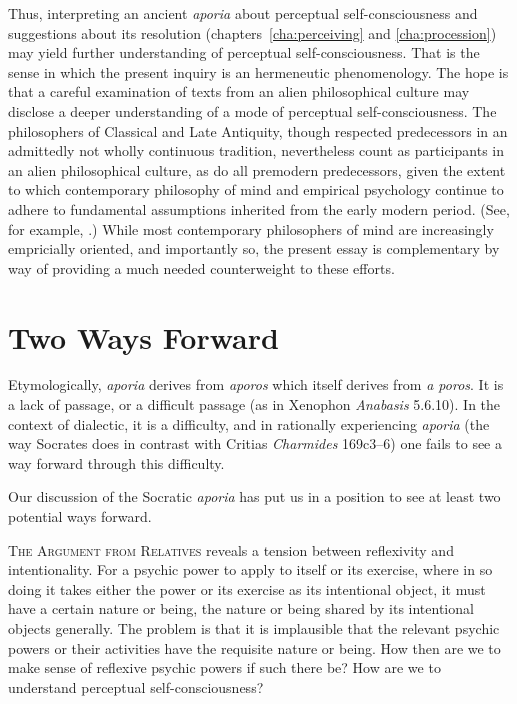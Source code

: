 Thus, interpreting an ancient \emph{aporia} about perceptual self-consciousness and suggestions about its resolution (chapters~\ref{cha:perceiving} and \ref{cha:procession}) may yield further understanding of perceptual self-consciousness. That is the sense in which the present inquiry is an hermeneutic phenomenology. The hope is that a careful examination of texts from an alien philosophical culture may disclose a deeper understanding of a mode of perceptual self-consciousness. The philosophers of Classical and Late Antiquity, though respected predecessors in an admittedly not wholly continuous tradition, nevertheless count as participants in an alien philosophical culture, as do all premodern predecessors, given the extent to which contemporary philosophy of mind and empirical psychology continue to adhere to fundamental assumptions inherited from the early modern period. (See, for example, \citealt{Wilkes:1992fh}.) While most contemporary philosophers of mind are increasingly empricially oriented, and importantly so, the present essay is complementary by way of providing a much needed counterweight to these efforts. 


\section{Two Ways Forward} %
\label{sec:coda}

Etymologically, \emph{aporia} derives from \emph{aporos} which itself derives from \emph{a poros}. It is a lack of passage, or a difficult passage (as in Xenophon \emph{Anabasis} 5.6.10). In the context of dialectic, it is a difficulty, and in rationally experiencing \emph{aporia} (the way Socrates does in contrast with Critias \emph{Charmides} 169c3–6) one fails to see a way forward through this difficulty.

Our discussion of the Socratic \emph{aporia} has put us in a position to see at least two potential ways forward.

\textsc{The Argument from Relatives} reveals a tension between reflexivity and intentionality. For a psychic power to apply to itself or its exercise, where in so doing it takes either the power or its exercise as its intentional object, it must have a certain nature or being, the nature or being shared by its intentional objects generally. The problem is that it is implausible that the relevant psychic powers or their activities have the requisite nature or being. How then are we to make sense of reflexive psychic powers if such there be? How are we to understand perceptual self-consciousness?

